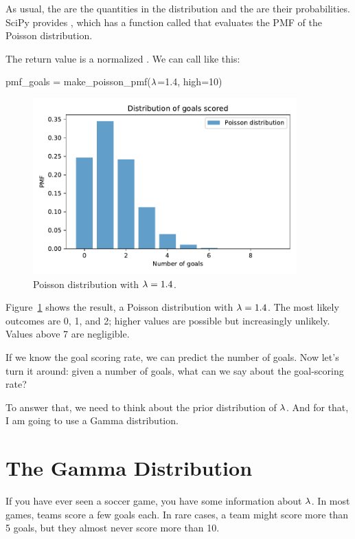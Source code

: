 \documentclass[12pt]{book}
\theoremstyle{exercise}
\begin{document}
As usual, the  are the quantities in the distribution and the  are their probabilities.
SciPy provides , which has a function called  that evaluates the PMF of the Poisson distribution.

The return value is a normalized .
We can call  like this:

\begin{code}
pmf_goals = make_poisson_pmf($\mathtt{\lambda}$=1.4, high=10)
\end{code}


\begin{figure}
\centerline{\includegraphics[width=4in]{figs/fig07-01.pdf}}
\caption{Poisson distribution with $\mathtt{\lambda}=1.4$.}
\label{fig07-01}
\end{figure}

Figure~\ref{fig07-01} shows the result, a Poisson distribution with $\mathtt{\lambda}=1.4$.
The most likely outcomes are 0, 1, and 2; higher values are possible but increasingly unlikely.
Values above 7 are negligible.

If we know the goal scoring rate, we can predict the number of goals.
Now let's turn it around: given a number of goals, what can we say about the goal-scoring rate?

To answer that, we need to think about the prior distribution of $\mathtt{\lambda}$. 
And for that, I am going to use a Gamma distribution.


\section{The Gamma Distribution}

If you have ever seen a soccer game, you have some information about $\mathtt{\lambda}$.  
In most games, teams score a few goals each.  
In rare cases, a team might score more than 5 goals, but they almost never score more than 10.
\end{document}
